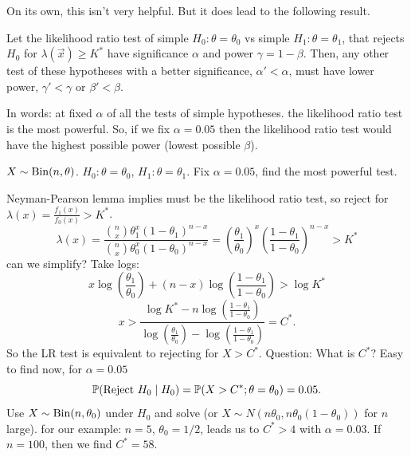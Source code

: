 \documentclass[10pt, a4paper]{article}
\begin{document}
On its own,
this isn't very helpful.
But it does lead to the following result.

\begin{lemma}
    Let the likelihood ratio test of simple $H_0 : \theta = \theta_0$ vs simple $H_1 : \theta = \theta_1$,
    that rejects $H_0$ for $\lambda(\vec{x}) \geq K ^ {*}$ have significance $\alpha$ and power $\gamma = 1 - \beta$.
    Then,
    any other test of these hypotheses with a better significance,
    $\alpha' < \alpha$,
    must have lower power,
    $\gamma' < \gamma$ or $\beta' < \beta$.
\end{lemma}
In words:
at fixed $\alpha$ of all the tests of simple hypotheses.
the likelihood ratio test is the most powerful.
So,
if we fix $\alpha = 0.05$ then the likelihood ratio test would have the highest possible power
(lowest possible $\beta$).

\begin{example}
    $X \sim \Bin(n, \theta)$.
    $H_0 : \theta = \theta_0$,
    $H_1 : \theta = \theta_1$.
    Fix $\alpha = 0.05$,
    find the most powerful test.

    Neyman-Pearson lemma implies must be the likelihood ratio test,
    so reject for $\lambda(x) = \frac{f_1(x)}{f_0(x)} > K ^ {*}$.
    \[
    \lambda(x) = \frac{\binom{n}{x}\theta_1 ^ x(1 - \theta_1) ^ {n - x}}{\binom{n}{x}\theta_0 ^ x(1 - \theta_0) ^ {n - x}} = \left(\frac{\theta_1}{\theta_0}\right) ^ x\left(\frac{1 - \theta_1}{1 - \theta_0}\right) ^ {n - x} > K ^ {*}
    \]
    can we simplify?
    Take logs:
    \[
    x\log\left(\frac{\theta_1}{\theta_0}\right) + (n - x)\log\left(\frac{1 - \theta_1}{1 - \theta_0}\right) > \log{K ^ {*}}
    \]
    \[
    x > \frac{\log{K ^ {*}} - n\log\left(\frac{1 - \theta_1}{1 - \theta_0}\right)}{\log\left(\frac{\theta_1}{\theta_0}\right) - \log\left(\frac{1 - \theta_1}{1 - \theta_0}\right)} = C ^ {*}.
    \]
    So the LR test is equivalent to rejecting for $X > C ^ {*}$.
    Question:
    What is $C ^ {*}$?
    Easy to find now,
    for $\alpha = 0.05$
    \[
    \P(\text{Reject } H_0 \mid H_0) = \P(X > C ^ {*}; \theta = \theta_0) = 0.05.
    \]
    Use $X \sim \Bin(n, \theta_0)$ under $H_0$ and solve
    (or $X \sim N(n\theta_0, n\theta_0(1 - \theta_0))$ for $n$ large).
    for our example:
    $n = 5$,
    $\theta_0 = 1/ 2$,
    leads us to $C ^ {*} > 4$ with $\alpha = 0.03$.
    If $n = 100$,
    then we find $C ^ {*} = 58$.
\end{example}

\newpage
\end{document}
